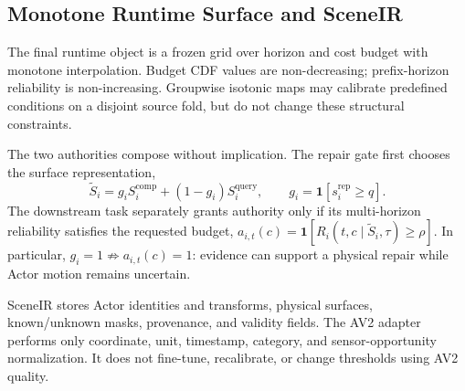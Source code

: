 \subsection{Monotone Runtime Surface and SceneIR}

The final runtime object is a frozen grid over horizon and cost budget with monotone interpolation. Budget CDF values are non-decreasing; prefix-horizon reliability is non-increasing. Groupwise isotonic maps may calibrate predefined conditions on a disjoint source fold, but do not change these structural constraints.

The two authorities compose without implication. The repair gate first chooses the surface representation,
\begin{equation}
\widetilde S_i=g_i S_i^{\mathrm{comp}}+(1-g_i)S_i^{\mathrm{query}},\qquad g_i=\mathbf 1[s_i^{\mathrm{rep}}\ge q].
\end{equation}
The downstream task separately grants authority only if its multi-horizon reliability satisfies the requested budget,
$a_{i,t}(c)=\mathbf 1[R_i(t,c\mid\widetilde S_i,\tau)\ge\rho]$. In particular, $g_i=1\not\Rightarrow a_{i,t}(c)=1$:
evidence can support a physical repair while Actor motion remains uncertain.

SceneIR stores Actor identities and transforms, physical surfaces, known/unknown masks, provenance, and validity fields. The AV2 adapter performs only coordinate, unit, timestamp, category, and sensor-opportunity normalization. It does not fine-tune, recalibrate, or change thresholds using AV2 quality.
